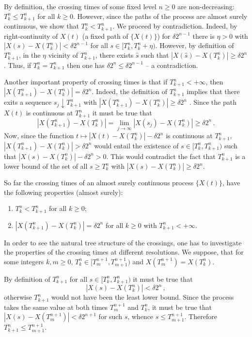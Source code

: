 By definition, the crossing times of some fixed level $n\geq 0$ are non-decreasing:
$T_k^n \leq T_{k+1}^n$ for all $k\geq 0$. However, since the paths of the process are
almost surely continuous, we show that $T_k^n < T_{k+1}^n$. We proceed by contradiction.
Indeed, by right-continuity of $X(t)$ (a fixed path of $\{X(t)\}$) for $\delta 2^{n-1}$
there is $\eta>0$ with $|X(s)-X(T_k^n)| < \delta 2^{n-1}$ for all $s\in [T_k^n, T_k^n + \eta)$.
However, by definition of $T_{k+1}^n$, in the $\eta$ vicinity of $T_{k+1}^n$,
there exists $\hat{s}$ such that $|X(\hat{s})-X(T_k^n)|\geq \delta 2^n$. Thus, if
$T_k^n = T_{k+1}^n$ then one has $\delta 2^n \leq \delta 2^{n-1}$ -- a contradiction.

Another important property of crossing times is that if $T_{k+1}^n < +\infty$, then
$|X(T_{k+1}^n)-X(T_k^n)| = \delta 2^n$. Indeed, the definition of $T_{k+1}^n$ implies
that there exits a sequence $s_j\downarrow T_{k+1}^n$ with $|X(T_{k+1}^n)-X(T_k^n)|\geq \delta 2^n$
. Since the path $X(t)$ is continuous at $T_{k+1}^n$ it must be true that
\[
|X(T_{k+1}^n)-X(T_k^n)| = \lim_{j\to \infty} |X(s_j)-X(T_k^n)| \geq \delta 2^n\,.
\]
Now, since the function $t\mapsto |X(t)-X(T_k^n)| - \delta 2^n$ is continuous at
$T_{k+1}^n$, $|X(T_{k+1}^n)-X(T_k^n)| > \delta 2^n$ would entail the existence of
$s\in [T_k^n, T_{k+1}^n)$ such that $|X(s)-X(T_k^n)| - \delta 2^n > 0$. This would
contradict the fact that $T_{k+1}^n$ is a lower bound of the set of all $s\geq T_k^n$
with $|X(s)-X(T_k^n)| \geq \delta 2^n$.

So far the crossing times of an almost surely continuous process $\{X(t)\}$, have
the following properties (almost surely): \begin{enumerate}
	\item $T_k^n < T_{k+1}^n$ for all $k\geq 0$;
	\item $|X(T_{k+1}^n)-X(T_k^n)| = \delta 2^n$ for all $k\geq0$ with $T_{k+1}^n<+\infty$.
\end{enumerate}

In order to see the natural tree structure of the crossings, one has to investigate
the properties of the crossing times at different resolutions. We suppose, that for
some integers $k,m\geq 0$, $T_k^n\in [T_m^{n+1}, T_{m+1}^{n+1})$ and $X(T_m^{n+1}) = X(T_k^n)$.

By definition of $T_{k+1}^n$ for all $s\in[T_k^n, T_{k+1}^n)$ it must be true that
\[ |X(s) - X(T_k^n)| < \delta 2^n \,,\]
otherwise $T_{k+1}^n$ would not have been the least lower bound. Since the process
takes the same value at both times $T_m^{n+1}$ and $T_k^n$, it must be true that
$|X(s) - X(T_m^{n+1})| < \delta 2^{n+1}$ for such $s$, whence $s\leq T_{m+1}^{n+1}$.
Therefore $T_{k+1}^n\leq T_{m+1}^{n+1}$.

